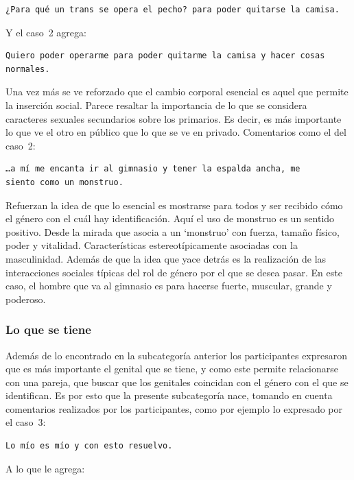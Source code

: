 \begin{verbatim}
¿Para qué un trans se opera el pecho? para poder quitarse la camisa.
\end{verbatim}

Y el caso~2 agrega:

\begin{verbatim}
Quiero poder operarme para poder quitarme la camisa y hacer cosas normales.
\end{verbatim}

Una vez más se ve reforzado que el cambio corporal esencial es aquel que permite
la inserción social. Parece resaltar la importancia de lo que se considera
caracteres sexuales secundarios sobre los primarios. Es decir, es más importante
lo que ve el otro en público que lo que se ve en privado. Comentarios como el
del caso~2:

\begin{verbatim}
…a mí me encanta ir al gimnasio y tener la espalda ancha, me
siento como un monstruo.
\end{verbatim}

Refuerzan la idea de que lo esencial es mostrarse para todos y ser recibido cómo
el género con el cuál hay identificación. Aquí el uso de monstruo es un sentido
positivo. Desde la mirada que asocia a un ‘monstruo’ con fuerza, tamaño físico,
poder y vitalidad. Características estereotípicamente asociadas con la
masculinidad. Además de que la idea que yace detrás es la realización de las
interacciones sociales típicas del rol de género por el que se desea pasar. En
este caso, el hombre que va al gimnasio es para hacerse fuerte, muscular, grande
y poderoso.

\subsubsection{Lo que se tiene}

Además de lo encontrado en la subcategoría anterior los participantes expresaron
que es más importante el genital que se tiene, y como este permite relacionarse
con una pareja, que buscar que los genitales coincidan con el género con el que
se identifican. Es por esto que la presente subcategoría nace, tomando en cuenta
comentarios realizados por los participantes, como por ejemplo lo expresado por
el caso~3:

\begin{verbatim}
Lo mío es mío y con esto resuelvo.
\end{verbatim}

A lo que le agrega:

